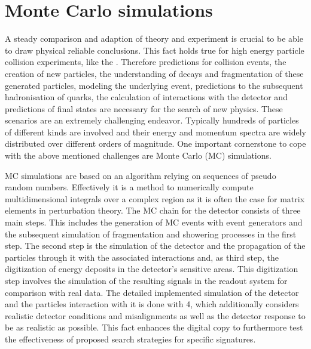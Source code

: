 \section{Monte Carlo simulations}\label{MCsim}
A steady comparison and adaption of theory and experiment is crucial to be able to draw physical reliable conclusions. This fact holds true for high energy particle collision experiments, like the {\LHC}. Therefore predictions for collision events, the creation of new particles, the understanding of decays and fragmentation of these generated particles, modeling the underlying event, predictions to the subsequent hadronisation of quarks, the calculation of interactions with the detector and predictions of final states are necessary for the search of new physics. These scenarios are an extremely challenging endeavor. Typically hundreds of particles of different kinds are involved and their energy and momentum spectra are widely distributed over different orders of magnitude. One important cornerstone to cope with the above mentioned challenges are Monte Carlo (MC) simulations. \cite{bigMC}\par
MC simulations are based on an algorithm relying on sequences of pseudo random numbers. Effectively it is a method to numerically compute multidimensional integrals over a complex region as it is often the case for matrix elements in perturbation theory. \cite{MCbook} The MC chain for the {\ATLAS} detector consists of three main steps. This includes the generation of MC events with event generators and the subsequent simulation of fragmentation and showering processes in the first step. The second step is the simulation of the detector and the propagation of the particles through it with the associated interactions and, as third step, the digitization of energy deposits in the detector's sensitive areas. This digitization step involves the simulation of the resulting signals in the readout system for comparison with real data. The detailed implemented simulation of the detector and the particles interaction with it is done with {\GEANT}4\cite{GEANT4}, which additionally considers realistic detector conditions and misalignments as well as the detector response to be as realistic as possible. This fact enhances the digital copy to furthermore test the effectiveness of proposed search strategies for specific signatures. \cite{ATLASSim}
